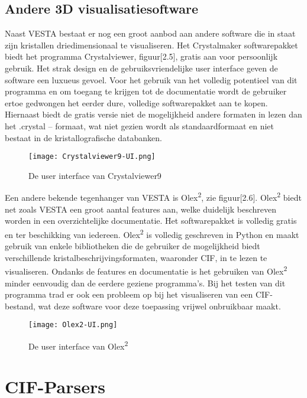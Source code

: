 \subsection{Andere 3D visualisatiesoftware}
Naast VESTA bestaat er nog een groot aanbod aan andere software die in staat zijn kristallen driedimensionaal te visualiseren. Het Crystalmaker softwarepakket biedt het programma Crystalviewer, figuur[2.5], gratis aan voor persoonlijk gebruik. Het strak design en de gebruiksvriendelijke user interface geven de software een luxueus gevoel. Voor het gebruik van het volledig potentieel van dit programma en om toegang te krijgen tot de documentatie wordt de gebruiker ertoe gedwongen het eerder dure, volledige softwarepakket aan te kopen. Hiernaast biedt de gratis versie niet de mogelijkheid andere formaten in lezen dan het .crystal – formaat, wat niet gezien wordt als standaardformaat en niet bestaat in de kristallografische databanken. 

\begin{figure}[h]
\texttt{[image: Crystalviewer9-UI.png]}
\caption{De user interface van Crystalviewer9}
\end{figure}

\par
Een andere bekende tegenhanger van VESTA is Olex\textsuperscript{2}, zie figuur[2.6]. Olex\textsuperscript{2} biedt net zoals VESTA een groot aantal features aan, welke duidelijk beschreven worden in een overzichtelijke documentatie. Het softwarepakket is volledig gratis en ter beschikking van iedereen. Olex\textsuperscript{2} is volledig geschreven in Python en maakt gebruik van enkele bibliotheken die de gebruiker de mogelijkheid biedt verschillende kristalbeschrijvingsformaten, waaronder CIF, in te lezen te visualiseren. Ondanks de features en documentatie is het gebruiken van Olex\textsuperscript{2} minder eenvoudig dan de eerdere geziene programma’s. Bij het testen van dit programma trad er ook een probleem op bij het visualiseren van een CIF-bestand, wat deze software voor deze toepassing vrijwel onbruikbaar maakt.

\begin{figure}[h]
\texttt{[image: Olex2-UI.png]}
\caption{De user interface van Olex\textsuperscript{2}}
\end{figure}

\section{CIF-Parsers}
